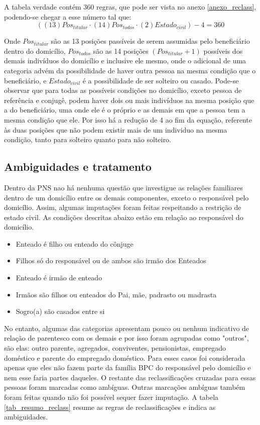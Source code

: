 \documentclass[
	12pt,				%
	openright,			%
	twoside,			%
	a4paper,			%
	english,			%
	french,				%
	spanish,			%
	brazil				%
	]{abntex2}
\begin{document}
	A tabela verdade contém 360 regras, que pode ser vista no anexo \ref{anexo_reclass}, podendo-se chegar a esse número tal que:
	\begin{equation}
	((13)Pos_{titular} \cdot  (14)Pos_{todos}  \cdot (2)Estado_{civil} )-4 = 360
	\end{equation}
	
	Onde $ Pos_{titular} $ são as 13 posições passíveis de serem assumidas pelo beneficiário dentro do domicílio, $ Pos_{todos} $ são as 14 posições $ (Pos_{titular}+1) $ possíveis dos demais indivíduos do domicílio e inclusive ele mesmo, onde o adicional de uma categoria advém da possibilidade de haver outra pessoa na mesma condição que o beneficiário, e $ Estado_{civil}  $ é a possibilidade de ser solteiro ou casado. Pode-se observar que para todas as possíveis condições no domicílio, exceto pessoa de referência e conjugê, podem haver dois ou mais indivíduos na mesma posição que a do beneficiário, uma onde ele é o próprio e as demais em que a pessoa tem a mesma condição que ele. Por isso há a redução de 4 ao fim da equação, referente às duas posições que não podem existir mais de um individuo na mesma condição, tanto para solteiro quanto para não solteiro.
	
	\subsection{Ambiguidades e tratamento}
	Dentro da PNS nao há nenhuma questão que investigue as relações familiares dentro de um domicílio entre os demais componentes, exceto o responsável pelo domicílio. Assim, algumas imputações foram feitas respeitando a restrição de estado civil. As condições descritas abaixo estão em relação ao responsável do domicílio.
		\begin{itemize}
			\item Enteado é filho ou enteado do cônjuge
			\item Filhos só do responsável ou de ambos são irmão dos Enteados
			\item Enteado é irmão de enteado
			\item Irmãos são filhos ou enteados do Pai, mãe, padrasto ou madrasta
			\item Sogro(a) são casados entre si
		\end{itemize}
	No entanto, algumas das categorias apresentam pouco ou nenhum indicativo de relação de parentesco com os demais e por isso foram agrupadas como "outros", são elas: outro parente, agregados, conviventes, pensionistas, empregado doméstico e parente do empregado doméstico. Para esses casos foi considerada apenas que eles não fazem parte da família BPC do responsável pelo domicílio e nem esse faria partes daqueles. O restante das reclassificações cruzadas para essas pessoas foram marcadas como ambíguas. Outras marcações ambíguas também foram feitas quando não foi possível sequer fazer imputação. A tabela \ref*{tab_resumo_reclass} resume as regras de reclassificações e indica as ambiguidades. 
	
\end{document}
